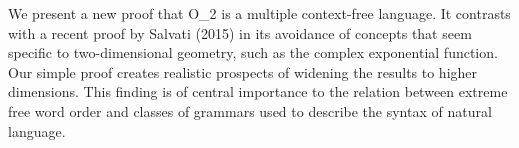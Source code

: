 We present a new proof that O\_2 is a multiple context-free language. It contrasts with a recent proof by Salvati (2015) in its avoidance of concepts that seem specific to two-dimensional geometry, such as the complex exponential function. Our simple proof creates realistic prospects of widening the results to higher dimensions. This finding is of central importance to the relation between extreme free word order and classes of grammars used to describe the syntax of natural language.
